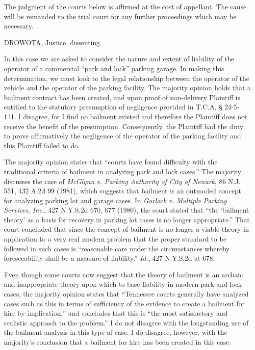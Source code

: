 The judgment of the courts below is affirmed at the cost of appellant. The cause
will be remanded to the trial court for any further proceedings which may be
necessary.

DROWOTA, Justice, dissenting.

In this case we are asked to consider the nature and extent of liability of the
operator of a commercial ``park and lock'' parking garage. In making this
determination, we must look to the legal relationship between the operator of
the vehicle and the operator of the parking facility. The majority opinion
holds that a bailment contract has been created, and upon proof of non-delivery
Plaintiff is entitled to the statutory presumption of negligence provided in
T.C.A. {\S} 24-5-111. I disagree, for I find no bailment existed and therefore
the Plaintiff does not receive the benefit of the presumption. Consequently,
the Plaintiff had the duty to prove affirmatively the negligence of the
operator of the parking facility and this Plaintiff failed to do.

The majority opinion states that ``courts have found difficulty with the
traditional criteria of bailment in analyzing park and lock cases.'' The
majority discusses the case of \textit{McGlynn v. Parking Authority of City of
Newark}, 86 N.J. 551, 432 A.2d 99 (1981), which suggests that bailment is an
outmoded concept for analyzing parking lot and garage cases. In \textit{Garlock
v. Multiple Parking Services, Inc}., 427 N.Y.S.2d 670, 677 (1980), the court
stated that ``the `bailment theory' as a basis for recovery in parking lot
cases is no longer appropriate.'' That court concluded that since the concept
of bailment is no longer a viable theory in application to a very real modern
problem that the proper standard to be followed in such cases is ``reasonable
care under the circumstances whereby foreseeability shall be a measure of
liability.'' \textit{Id.}, 427 N.Y.S.2d at 678.

Even though some courts now suggest that the theory of bailment is an archaic
and inappropriate theory upon which to base liability in modern park and lock
cases, the majority opinion states that ``Tennessee courts generally have
analyzed cases such as this in terms of sufficiency of the evidence to create a
bailment for hire by implication,'' and concludes that this is ``the most
satisfactory and realistic approach to the problem.'' I do not disagree with
the longstanding use of the bailment analysis in this type of case. I do
disagree, however, with the majority's conclusion that a bailment for hire has
been created in this case.


